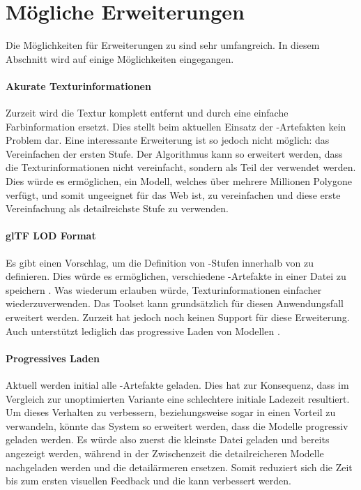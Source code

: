 \section{Mögliche Erweiterungen}
Die Möglichkeiten für Erweiterungen zu  sind sehr umfangreich. In diesem Abschnitt wird auf einige Möglichkeiten eingegangen.

\paragraph{Akurate Texturinformationen}
Zurzeit wird die Textur komplett entfernt und durch eine einfache Farbinformation ersetzt. Dies stellt beim aktuellen Einsatz der -Artefakten kein Problem dar. Eine interessante Erweiterung ist so jedoch nicht möglich: das Vereinfachen der ersten Stufe. Der Algorithmus kann so erweitert werden, dass die Texturinformationen nicht vereinfacht, sondern als Teil der  verwendet werden. Dies würde es ermöglichen, ein Modell, welches über mehrere Millionen Polygone verfügt, und somit ungeeignet für das Web ist, zu vereinfachen und diese erste Vereinfachung als detailreichste Stufe zu verwenden.

\paragraph{glTF LOD Format}
Es gibt einen Vorschlag, um die Definition von -Stufen innerhalb von  zu definieren. Dies würde es ermöglichen, verschiedene -Artefakte in einer Datei zu speichern \cite{glTFExtensionLOD}. Was wiederum erlauben würde, Texturinformationen einfacher wiederzuverwenden. Das Toolset kann grundsätzlich für diesen Anwendungsfall erweitert werden.
Zurzeit hat  jedoch noch keinen Support für diese Erweiterung. Auch  unterstützt lediglich das progressive Laden von Modellen \cite{babylonProgressiveLoading}.

\paragraph{Progressives Laden}
Aktuell werden initial alle -Artefakte geladen. Dies hat zur Konsequenz, dass im Vergleich zur unoptimierten Variante eine schlechtere initiale Ladezeit resultiert. Um dieses Verhalten zu verbessern, beziehungsweise sogar in einen Vorteil zu verwandeln, könnte das System so erweitert werden, dass die Modelle progressiv geladen werden. Es würde also zuerst die kleinste Datei geladen und bereits angezeigt werden, während in der Zwischenzeit die detailreicheren Modelle nachgeladen werden und die detailärmeren ersetzen. Somit reduziert sich die Zeit bis zum ersten visuellen Feedback und die  kann verbessert werden.

